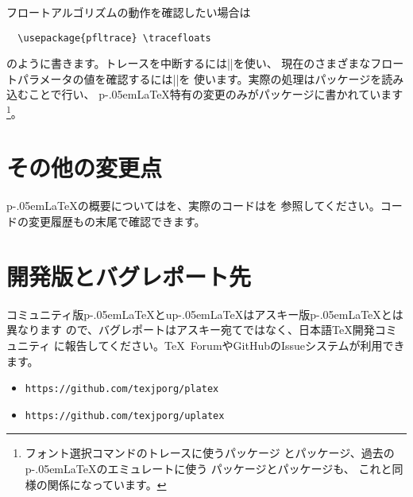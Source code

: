 \documentclass{plnews}
\def\pLaTeX{p\kern-.05em\LaTeX}
\begin{document}
フロートアルゴリズムの動作を確認したい場合は
\begin{verbatim}
  \usepackage{pfltrace} \tracefloats
\end{verbatim}
のように書きます。トレースを中断するには|\tracefloatsoff|を使い、
現在のさまざまなフロートパラメータの値を確認するには|\tracefloatvals|を
使います。実際の処理はパッケージを読み込むことで行い、
\pLaTeX{}特有の変更のみがパッケージに書かれています
\footnote{フォント選択コマンドのトレースに使うパッケージ
とパッケージ、過去の\pLaTeX{}のエミュレートに使う
パッケージとパッケージも、
これと同様の関係になっています。}。


\section{その他の変更点}
\pLaTeX{}の概要についてはを、実際のコードはを
参照してください。コードの変更履歴もの末尾で確認できます。


\section{開発版とバグレポート先}
コミュニティ版\pLaTeX{}とu\pLaTeX{}はアスキー版\pLaTeX{}とは異なります
ので、バグレポートはアスキー宛てではなく、日本語\TeX{}開発コミュニティ
に報告してください。\TeX\ ForumやGitHubのIssueシステムが利用できます。
\begin{itemize}
\item \texttt{https://github.com/texjporg/platex}
\item \texttt{https://github.com/texjporg/uplatex}
\end{itemize}
\end{document}
